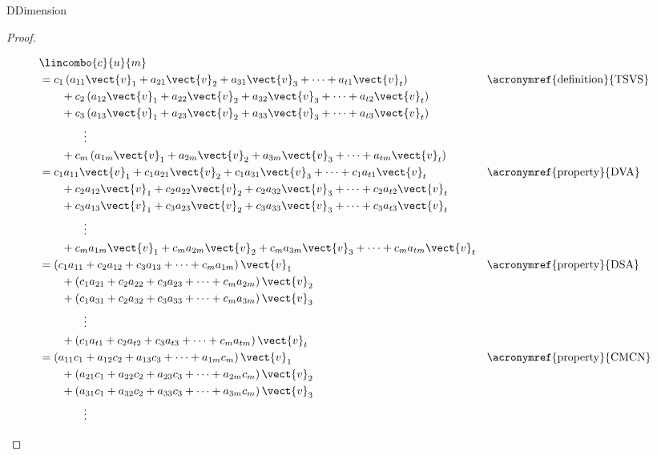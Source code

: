 \begin{subsect}{D}{Dimension}
\begin{proof}
\begin{para}
%
\begin{align*}
&\lincombo{c}{u}{m}\\
%
&=c_{1}\left(a_{11}\vect{v}_1+a_{21}\vect{v}_2+a_{31}\vect{v}_3+\cdots+a_{t1}\vect{v}_t\right)
&&\text{\acronymref{definition}{TSVS}}\\
&\quad\quad+c_{2}\left(a_{12}\vect{v}_1+a_{22}\vect{v}_2+a_{32}\vect{v}_3+\cdots+a_{t2}\vect{v}_t\right)\\
&\quad\quad+c_{3}\left(a_{13}\vect{v}_1+a_{23}\vect{v}_2+a_{33}\vect{v}_3+\cdots+a_{t3}\vect{v}_t\right)\\
&\quad\quad\quad\quad\vdots\\
&\quad\quad+c_{m}\left(a_{1m}\vect{v}_1+a_{2m}\vect{v}_2+a_{3m}\vect{v}_3+\cdots+a_{tm}\vect{v}_t\right)\\
%
&=c_{1}a_{11}\vect{v}_1+c_{1}a_{21}\vect{v}_2+c_{1}a_{31}\vect{v}_3+\cdots+c_{1}a_{t1}\vect{v}_t
&&\text{\acronymref{property}{DVA}}\\
&\quad\quad+c_{2}a_{12}\vect{v}_1+c_{2}a_{22}\vect{v}_2+c_{2}a_{32}\vect{v}_3+\cdots+c_{2}a_{t2}\vect{v}_t\\
&\quad\quad+c_{3}a_{13}\vect{v}_1+c_{3}a_{23}\vect{v}_2+c_{3}a_{33}\vect{v}_3+\cdots+c_{3}a_{t3}\vect{v}_t\\
&\quad\quad\quad\quad\vdots\\
&\quad\quad+c_{m}a_{1m}\vect{v}_1+c_{m}a_{2m}\vect{v}_2+c_{m}a_{3m}\vect{v}_3+\cdots+c_{m}a_{tm}\vect{v}_t\\
%
&=\left(c_{1}a_{11}+c_{2}a_{12}+c_{3}a_{13}+\cdots+c_{m}a_{1m}\right)\vect{v}_1
&&\text{\acronymref{property}{DSA}}\\
&\quad\quad+\left(c_{1}a_{21}+c_{2}a_{22}+c_{3}a_{23}+\cdots+c_{m}a_{2m}\right)\vect{v}_2\\
&\quad\quad+\left(c_{1}a_{31}+c_{2}a_{32}+c_{3}a_{33}+\cdots+c_{m}a_{3m}\right)\vect{v}_3\\
&\quad\quad\quad\quad\vdots\\
&\quad\quad+\left(c_{1}a_{t1}+c_{2}a_{t2}+c_{3}a_{t3}+\cdots+c_{m}a_{tm}\right)\vect{v}_t\\
%
&=\left(a_{11}c_{1}+a_{12}c_{2}+a_{13}c_{3}+\cdots+a_{1m}c_{m}\right)\vect{v}_1
&&\text{\acronymref{property}{CMCN}}\\
%
&\quad\quad+\left(a_{21}c_{1}+a_{22}c_{2}+a_{23}c_{3}+\cdots+a_{2m}c_{m}\right)\vect{v}_2\\
&\quad\quad+\left(a_{31}c_{1}+a_{32}c_{2}+a_{33}c_{3}+\cdots+a_{3m}c_{m}\right)\vect{v}_3\\
&\quad\quad\quad\quad\vdots\\

\end{align*}
\end{para}
\end{proof}
\end{subsect}
